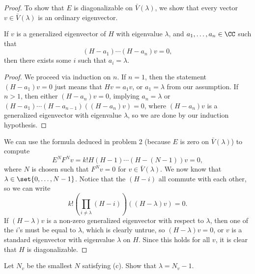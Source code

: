 \documentclass{article}
\begin{document}
\begin{proof}
To show that $E$ is diagonalizable on $\bar{V}(\lambda)$, we show that every
vector $v \in \bar{V}(\lambda)$ is an ordinary eigenvector.

\begin{lem}
If $v$ is a generalized eigenvector of $H$ with eigenvalue $\lambda$, and $a_1,
\dots, a_n \in \CC$ such that
\[ (H - a_1) \cdots (H - a_n) v = 0, \]
then there exists some $i$ such that $a_i = \lambda$.
\end{lem}

\begin{proof}
We proceed via induction on $n$.  If $n = 1$, then the statement $(H - a_1)v =
0$ just means that $Hv = a_1v$, or $a_1 = \lambda$ from our assumption. If $n >
1$, then either $(H - a_n)v = 0$, implying $a_n = \lambda$ or $(H - a_1) \cdots
(H - a_{n - 1})((H - a_n)v) = 0$, where $(H - a_n)v$ is a generalized
eigenvector with eigenvalue $\lambda$, so we are done by our induction
hypothesis.
\end{proof}

We can use the formula deduced in problem 2 (because $E$ is zero on
$\bar{V}(\lambda)$) to compute
\[ E^N F^N v = k! H (H - 1) \cdots (H - (N - 1)) v = 0, \]
where $N$ is chosen such that $F^N v = 0$ for $v \in \bar{V}(\lambda)$. We now
know that $\lambda \in \set{0, \dots, N - 1}$. Notice that the $(H - i)$ all
commute with each other, so we can write
\[ k! \left( \prod_{i \neq \lambda} (H - i) \right) ((H - \lambda)v) = 0. \]
If $(H - \lambda)v$ is a non-zero generalized eigenvector with respect to
$\lambda$, then one of the $i$'s must be equal to $\lambda$, which is clearly
untrue, so $(H - \lambda)v = 0$, or $v$ is a standard eigenvector with
eigenvalue $\lambda$ on $H$. Since this holds for all $v$, it is clear that $H$
is diagonalizable.
\end{proof}

\begin{prop}
Let $N_v$ be the smallest $N$ satisfying (c). Show that $\lambda = N_v - 1$.
\end{prop}
\end{document}
